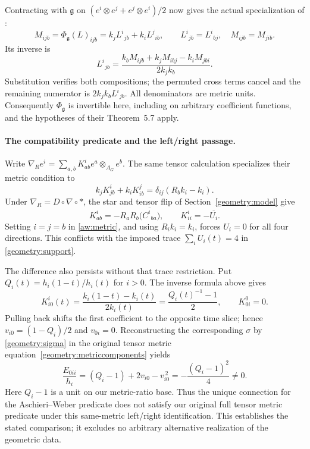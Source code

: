 \documentclass[11pt,a4paper]{article}
\theoremstyle{remark}\newtheorem{remark}[theorem]{Remark}
\begin{document}
Contracting with $\mathfrak g$ on
$(e^i\otimes e^j+e^j\otimes e^i)/2$ now gives the actual specialization
of \cite[equations~(5.9)--(5.10)]{orig-aw25}:
\[
 M_{ijb}=\Phi_{\mathfrak g}(L)_{ijb}
          =k_jL^i{}_{jb}+k_iL^j{}_{ib},\qquad
 L^i{}_{jb}=L^i{}_{bj},\quad M_{ijb}=M_{jib}.
\]
Its inverse is
\[
 L^i{}_{jb}
 =\frac{k_bM_{ijb}+k_jM_{ibj}-k_iM_{jbi}}{2k_jk_b}.
\]
Substitution verifies both compositions; the permuted cross terms
cancel and the remaining numerator is $2k_jk_bL^i{}_{jb}$.
All denominators are metric units. Consequently $\Phi_{\mathfrak g}$
is invertible here, including on arbitrary coefficient functions, and
the hypotheses of their Theorem~5.7 apply.

\paragraph{The compatibility predicate and the left/right passage.}
Write $\nabla_Re^i=\sum_{a,b}K^i_{ab}e^a\otimes_{A_G}e^b$.
The same tensor calculation specializes their metric condition to
\begin{equation}\label{aw:metric}
 k_jK^i_{jb}+k_iK^j_{ib}
       =\delta_{ij}(R_bk_i-k_i).
\end{equation}
Under $\nabla_R=D\circ\nabla\circ *$, the star and tensor flip of
Section~\ref{geometry:model} give
\[
 K^i_{ab}=-R_aR_b\bigl(\overline{C^i{}_{ba}}\bigr),
 \qquad K^i_{ii}=-\overline{U_i}.
\]
Setting $i=j=b$ in \eqref{aw:metric}, and using $R_ik_i=k_i$,
forces $U_i=0$ for all four directions. This conflicts with the
imposed trace $\sum_iU_i(t)=4$ in \eqref{geometry:support}.

The difference also persists without that trace restriction. Put
$Q_i(t)=h_i(1-t)/h_i(t)$ for $i>0$. The inverse formula above gives
\[
 K^i_{i0}(t)=\frac{k_i(1-t)-k_i(t)}{2k_i(t)}
            =\frac{Q_i(t)^{-1}-1}{2},\qquad K^0_{0i}=0.
\]
Pulling back shifts the first coefficient to the opposite time slice;
hence $v_{i0}=(1-Q_i)/2$ and $v_{0i}=0$. Reconstructing the corresponding
$\sigma$ by \eqref{geometry:sigma} in the original tensor metric
equation~\eqref{geometry:metriccomponents} yields
\begin{equation}\label{aw:residual}
 \frac{E_{0ii}}{h_i}
 =(Q_i-1)+2v_{i0}-v_{i0}^{\,2}
 =-\frac{(Q_i-1)^2}{4}\ne0.
\end{equation}
Here $Q_i-1$ is a unit on our metric-ratio base. Thus the unique
connection for the Aschieri--Weber predicate does not satisfy our
original full tensor metric predicate under this same-metric
left/right identification. This establishes the stated comparison;
it excludes no arbitrary alternative realization of the geometric data.
\end{document}
